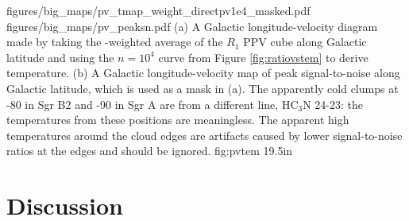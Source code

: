 \RotFigureTwoAA
{figures/big_maps/pv_tmap_weight_directpv1e4_masked.pdf}
{figures/big_maps/pv_peaksn.pdf}
{(a) A Galactic longitude-velocity diagram made by taking the
\threeohthree-weighted average of the $R_1$ PPV cube along Galactic latitude
and using the $n=10^4$ \percc curve
from Figure \ref{fig:ratiovstem} to derive temperature.  (b) A Galactic
longitude-velocity map of peak
signal-to-noise along Galactic latitude, which is used as a mask in (a).  The
apparently cold clumps at -80 \kms in Sgr
B2 and -90 \kms in Sgr A are from a different line, HC$_3$N 24-23: the
temperatures from these positions are meaningless.
The apparent high temperatures around the cloud edges are artifacts caused by
lower signal-to-noise ratios at the edges and should be ignored.
}
{fig:pvtem}
{1}{9.5in}



\clearpage
\section{Discussion}
\label{sec:discussion}
